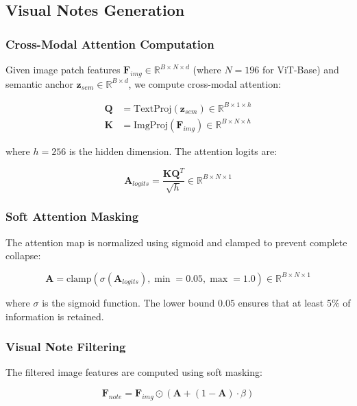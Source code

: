 \documentclass[11pt]{article}
\begin{document}
\subsection{Visual Notes Generation}

\subsubsection{Cross-Modal Attention Computation}

Given image patch features $\mathbf{F}_{img} \in \mathbb{R}^{B \times N \times d}$ (where $N=196$ for ViT-Base) and semantic anchor $\mathbf{z}_{sem} \in \mathbb{R}^{B \times d}$, we compute cross-modal attention:

\begin{align}
\mathbf{Q} &= \text{TextProj}(\mathbf{z}_{sem}) \in \mathbb{R}^{B \times 1 \times h} \\
\mathbf{K} &= \text{ImgProj}(\mathbf{F}_{img}) \in \mathbb{R}^{B \times N \times h}
\end{align}

where $h=256$ is the hidden dimension. The attention logits are:

\begin{equation}
\mathbf{A}_{logits} = \frac{\mathbf{K} \mathbf{Q}^T}{\sqrt{h}} \in \mathbb{R}^{B \times N \times 1}
\end{equation}

\subsubsection{Soft Attention Masking}

The attention map is normalized using sigmoid and clamped to prevent complete collapse:

\begin{equation}
\mathbf{A} = \text{clamp}(\sigma(\mathbf{A}_{logits}), \min=0.05, \max=1.0) \in \mathbb{R}^{B \times N \times 1}
\end{equation}

where $\sigma$ is the sigmoid function. The lower bound $0.05$ ensures that at least 5\% of information is retained.

\subsubsection{Visual Note Filtering}

The filtered image features are computed using soft masking:

\begin{equation}
\mathbf{F}_{note} = \mathbf{F}_{img} \odot (\mathbf{A} + (1 - \mathbf{A}) \cdot \beta)
\end{equation}
\end{document}
